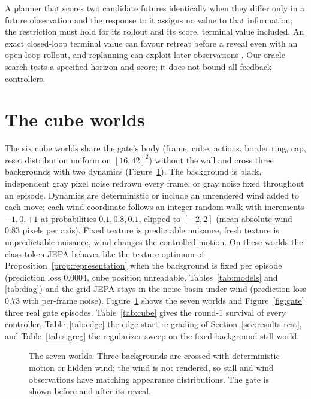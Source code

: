 \begin{remark}
\label{rem:voi}
A planner that scores two candidate futures identically when they differ only in a future observation
and the response to it assigns no value to that information; the restriction must hold for its
rollout and its score, terminal value included. An exact closed-loop terminal value can favour retreat
before a reveal even with an open-loop rollout, and replanning can exploit later observations
\citep{howard1966information,barshalom1974dual}. Our oracle search tests a specified horizon and
score; it does not bound all feedback controllers.
\end{remark}

\section{The cube worlds}
\label{app:cubes}

The six cube worlds share the gate's body (frame, cube, actions, border ring, cap, reset distribution
uniform on $[16,42]^2$) without the wall and cross three backgrounds with two dynamics
(Figure~\ref{fig:worlds}). The background is black, independent gray pixel noise redrawn every frame,
or gray noise fixed throughout an episode. Dynamics are deterministic or include an unrendered wind
added to each move; each wind coordinate follows an integer random walk with increments $-1,0,+1$ at
probabilities $0.1,0.8,0.1$, clipped to $[-2,2]$ (mean absolute wind $0.83$ pixels per axis). Fixed
texture is predictable nuisance, fresh texture is unpredictable nuisance, wind changes the controlled
motion. On these worlds the class-token JEPA behaves like the texture optimum of
Proposition~\ref{prop:representation} when the background is fixed per episode (prediction loss
$0.0004$, cube position unreadable, Tables~\ref{tab:models} and \ref{tab:diag}) and the grid JEPA
stays in the noise basin under wind (prediction loss $0.73$ with per-frame noise). Figure~\ref{fig:worlds} shows the
seven worlds and Figure~\ref{fig:gate} three real gate episodes. Table~\ref{tab:cube} gives the
round-1 survival of every controller, Table~\ref{tab:edge} the edge-start re-grading of
Section~\ref{sec:results-rest}, and Table~\ref{tab:sigreg} the regularizer sweep on the fixed-background
still world.

\begin{figure}[ht]
\centering
{}
\caption{The seven worlds. Three backgrounds are crossed with deterministic motion or hidden wind; the
wind is not rendered, so still and wind observations have matching appearance distributions. The gate
is shown before and after its reveal.}
\label{fig:worlds}
\end{figure}

